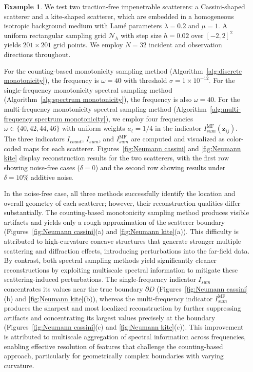 \documentclass[11pt,reqno,twoside]{amsart}
\theoremstyle{definition}
\newtheorem{example}{Example}[section]
\theoremstyle{remark}
\numberwithin{equation}{section}
\begin{document}
\begin{example}\label{ex:Neumann spectrum}
We test two traction-free impenetrable scatterers: a Cassini-shaped scatterer and a kite-shaped scatterer, which are embedded in a homogeneous isotropic background medium with Lam\'{e} parameters $\lambda = 0.2$ and $\mu = 1$. A uniform rectangular sampling grid $\mathcal{N}_h$ with step size $h = 0.02$ over $[-2,2]^2$ yields $201\times 201$ grid points. We employ $N = 32$ incident and observation directions throughout.

For the counting-based monotonicity sampling method (Algorithm~\ref{alg:discrete monotonicity}), the frequency is $\omega = 40$ with threshold $\sigma = 1\times 10^{-12}$. For the single-frequency monotonicity spectral sampling method (Algorithm~\ref{alg:spectrum monotonicity}), the frequency is also $\omega = 40$. For the multi-frequency monotonicity spectral sampling method (Algorithm~\ref{alg:multi-frequency spectrum monotonicity}), we employ four frequencies $\omega \in \{40, 42, 44, 46\}$ with uniform weights $a_\ell = 1/4$ in the indicator $I_{sum}^{\mathrm{MF}}(\mathbf{z}_{ij})$.
The three indicators $I_{count}$, $I_{sum}$, and $I_{sum}^{\mathrm{MF}}$ are computed and visualized as color-coded maps for each scatterer. Figures~\ref{fig:Neumann cassini} and \ref{fig:Neumann kite} display reconstruction results for the two scatterers, with the first row showing noise-free cases ($\delta = 0$) and the second row showing results under $\delta = 10\%$ additive noise.

In the noise-free case, all three methods successfully identify the location and overall geometry of each scatterer; however, their reconstruction qualities differ substantially. The counting-based monotonicity sampling method produces visible artifacts and yields only a rough approximation of the scatterer boundary (Figures~\ref{fig:Neumann cassini}(a) and \ref{fig:Neumann kite}(a)). This difficulty is attributed to high-curvature concave structures that generate stronger multiple scattering and diffraction effects, introducing perturbations into the far-field data. By contrast, both spectral sampling methods yield significantly cleaner reconstructions by exploiting multiscale spectral information to mitigate these scattering-induced perturbations. The single-frequency indicator $I_{sum}$ concentrates its values near the true boundary $\partial D$ (Figures~\ref{fig:Neumann cassini}(b) and \ref{fig:Neumann kite}(b)), whereas the multi-frequency indicator $I_{sum}^{\mathrm{MF}}$ produces the sharpest and most localized reconstruction by further suppressing artifacts and concentrating its largest values precisely at the boundary (Figures~\ref{fig:Neumann cassini}(c) and \ref{fig:Neumann kite}(c)). This improvement is attributed to multiscale aggregation of spectral information across frequencies, enabling effective resolution of features that challenge the counting-based approach, particularly for geometrically complex boundaries with varying curvature.


\end{example}
\end{document}
